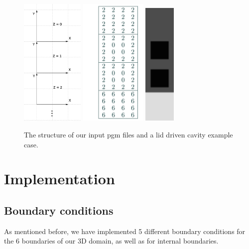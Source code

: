 \documentclass[a4paper, 12pt]{article}
\begin{document}
\begin{figure}[ht!]
\centering
\label{fig1}
\includegraphics[height=6.2cm]{coord.jpg}
\includegraphics[height=6.2cm]{cavity.png}
\includegraphics[height=6cm]{cavity20202.jpg}
\caption{The structure of our input pgm files and a lid driven cavity example case.}
\end{figure}


\section{Implementation}\label{sec:implement}
\subsection{Boundary conditions}\label{sec:boundary_vel}
As mentioned before, we have implemented 5 different boundary conditions for the 6 boundaries of our 3D domain, as well as for internal boundaries.
\end{document}
